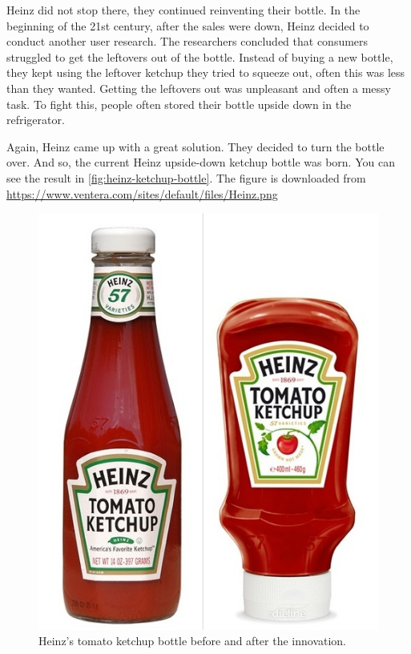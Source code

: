 Heinz did not stop there, they continued reinventing their bottle. In the beginning of the 21st century, after the sales were down, Heinz decided to conduct another user research. The researchers concluded that consumers struggled to get the leftovers out of the bottle. Instead of buying a new bottle, they kept using the leftover ketchup they tried to squeeze out, often this was less than they wanted. Getting the leftovers out was unpleasant and often a messy task. To fight this, people often stored their bottle upside down in the refrigerator. 

Again, Heinz came up with a great solution. They decided to turn the bottle over. And so, the current Heinz upside-down ketchup bottle was born.
You can see the result in \autoref{fig:heinz-ketchup-bottle}. The figure is downloaded from \url{https://www.ventera.com/sites/default/files/Heinz.png}

\begin{figure}[h!]
\centering
\includegraphics[scale=0.2]{figures/ketchup.png}
\caption{Heinz's tomato ketchup bottle before and after the innovation.}
\label{fig:heinz-ketchup-bottle}
\end{figure}
